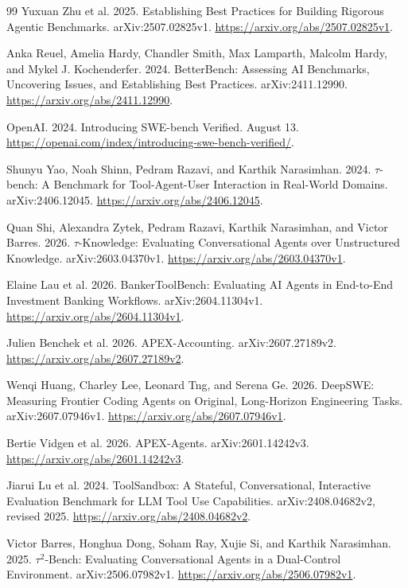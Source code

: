 \documentclass[11pt,letterpaper]{article}
\begin{document}
\begin{thebibliography}{99}
 Yuxuan Zhu et al. 2025. Establishing Best Practices for Building Rigorous Agentic Benchmarks. arXiv:2507.02825v1. \url{https://arxiv.org/abs/2507.02825v1}.

 Anka Reuel, Amelia Hardy, Chandler Smith, Max Lamparth, Malcolm Hardy, and Mykel J. Kochenderfer. 2024. BetterBench: Assessing AI Benchmarks, Uncovering Issues, and Establishing Best Practices. arXiv:2411.12990. \url{https://arxiv.org/abs/2411.12990}.

 OpenAI. 2024. Introducing SWE-bench Verified. August 13. \url{https://openai.com/index/introducing-swe-bench-verified/}.

 Shunyu Yao, Noah Shinn, Pedram Razavi, and Karthik Narasimhan. 2024. \(\tau\)-bench: A Benchmark for Tool-Agent-User Interaction in Real-World Domains. arXiv:2406.12045. \url{https://arxiv.org/abs/2406.12045}.

 Quan Shi, Alexandra Zytek, Pedram Razavi, Karthik Narasimhan, and Victor Barres. 2026. \(\tau\)-Knowledge: Evaluating Conversational Agents over Unstructured Knowledge. arXiv:2603.04370v1. \url{https://arxiv.org/abs/2603.04370v1}.

 Elaine Lau et al. 2026. BankerToolBench: Evaluating AI Agents in End-to-End Investment Banking Workflows. arXiv:2604.11304v1. \url{https://arxiv.org/abs/2604.11304v1}.

 Julien Benchek et al. 2026. APEX-Accounting. arXiv:2607.27189v2. \url{https://arxiv.org/abs/2607.27189v2}.

 Wenqi Huang, Charley Lee, Leonard Tng, and Serena Ge. 2026. DeepSWE: Measuring Frontier Coding Agents on Original, Long-Horizon Engineering Tasks. arXiv:2607.07946v1. \url{https://arxiv.org/abs/2607.07946v1}.

 Bertie Vidgen et al. 2026. APEX-Agents. arXiv:2601.14242v3. \url{https://arxiv.org/abs/2601.14242v3}.

 Jiarui Lu et al. 2024. ToolSandbox: A Stateful, Conversational, Interactive Evaluation Benchmark for LLM Tool Use Capabilities. arXiv:2408.04682v2, revised 2025. \url{https://arxiv.org/abs/2408.04682v2}.

 Victor Barres, Honghua Dong, Soham Ray, Xujie Si, and Karthik Narasimhan. 2025. \(\tau^2\)-Bench: Evaluating Conversational Agents in a Dual-Control Environment. arXiv:2506.07982v1. \url{https://arxiv.org/abs/2506.07982v1}.


\end{thebibliography}
\end{document}
